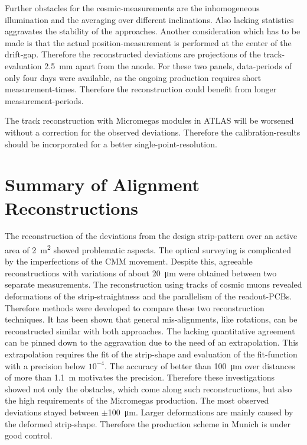 \documentclass[
twoside,            %
BCOR1.4cm,          %
10pt,               %
headings=normal,    %
headsepline,        %
clearplainpage,		%
final,              %
div=14,
open=right,
bibliography=toc
]{scrreprt}
\begin{document}
Further obstacles for the cosmic-measurements are the inhomogeneous illumination and the averaging over different inclinations.
Also lacking statistics aggravates the stability of the approaches.
Another consideration which has to be made is that the actual position-measurement is performed at the center of the drift-gap.
Therefore the reconstructed deviations are projections of the track-evaluation \SI{2.5}{mm} apart from the anode.
For these two panels, data-periods of only four days were available, as the ongoing production requires short measurement-times.
Therefore the reconstruction could benefit from longer measurement-periods.

The track reconstruction with Micromegas modules in ATLAS will be worsened without a correction for the observed deviations.
Therefore the calibration-results should be incorporated for a better single-point-resolution.

\section{Summary of Alignment Reconstructions}

The reconstruction of the deviations from the design strip-pattern over an active area of \SI{2}{\square\m} showed problematic aspects.
The optical surveying is complicated by the imperfections of the CMM movement.
Despite this, agreeable reconstructions with variations of about \SI{20}{\micro\m} were obtained between two separate measurements.
The reconstruction using tracks of cosmic muons revealed deformations of the strip-straightness and the parallelism of the readout-PCBs.
Therefore methods were developed to compare these two reconstruction techniques.
It has been shown that general mis-alignments, like rotations, can be reconstructed similar with both approaches. 
The lacking quantitative agreement can be pinned down to the aggravation due to the need of an extrapolation.
This extrapolation requires the fit of the strip-shape and evaluation of the fit-function with a precision below $10^{-4}$.
The accuracy of better than \SI{100}{\micro\m} over distances of more than \SI{1.1}{m} motivates the precision.
Therefore these investigations showed not only the obstacles, which come along such reconstructions, but also the high requirements of the Micromegas production.
The most observed deviations stayed between $\pm$\SI{100}{\micro\m}.
Larger deformations are mainly caused by the deformed strip-shape.
Therefore the production scheme in Munich is under good control.
\end{document}
